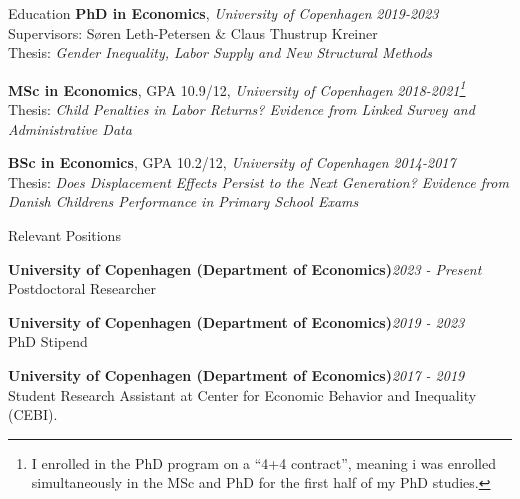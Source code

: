 \documentclass[
	11pt, %
]{resume} %
\begin{document}

\begin{rSection}{Education}
    \textbf{PhD in Economics}, \textit{University of Copenhagen} \hfill \textit{2019-2023} \\
    Supervisors: Søren Leth-Petersen \& Claus Thustrup Kreiner \\
    Thesis: \textit{Gender Inequality, Labor Supply and New Structural Methods}

    \textbf{MSc in Economics}, GPA 10.9/12, \textit{University of Copenhagen} \hfill \textit{2018-2021\footnote{I enrolled in the PhD program on a ``4+4 contract'', meaning i was enrolled simultaneously in the MSc and PhD for the first half of my PhD studies.}} \\
    Thesis: \textit{Child Penalties in Labor Returns? Evidence from Linked Survey and Administrative Data}

    \textbf{BSc in Economics}, GPA 10.2/12, \textit{University of Copenhagen} \hfill \textit{2014-2017} \\
    Thesis: \textit{Does Displacement Effects Persist to the Next Generation? Evidence from Danish Childrens Performance in Primary School Exams}
\end{rSection}


\begin{rSection}{Relevant Positions}

    \textbf{University of Copenhagen (Department of Economics)}\hfill \textit{2023 - Present} \\
    Postdoctoral Researcher

    \textbf{University of Copenhagen (Department of Economics)}\hfill \textit{2019 - 2023} \\
    PhD Stipend

    \textbf{University of Copenhagen (Department of Economics)}\hfill \textit{2017 - 2019} \\
    Student Research Assistant at Center for Economic Behavior and Inequality (CEBI).

\end{rSection}
\end{document}
